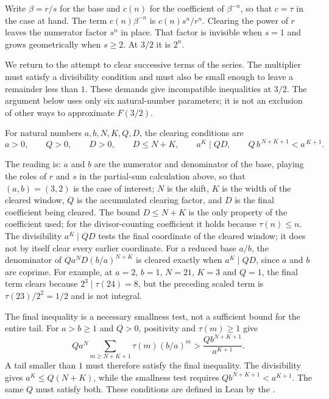 \documentclass[11pt]{article}
\begin{document}
Write $\beta=r/s$ for the base and $c(n)$ for the coefficient of $\beta^{-n}$,
so that $c=\tau$ in the case at hand.  The term $c(n)\beta^{-n}$ is
$c(n)s^{n}/r^{n}$.  Clearing the
power of $r$ leaves the numerator factor $s^{n}$ in place.  That factor is
invisible when $s=1$ and grows geometrically when $s\ge2$.  At $3/2$ it is
$2^{n}$.


We return to the attempt to clear successive terms of the series.
The multiplier must satisfy a divisibility condition and must also be
small enough to leave a remainder less than $1$. These demands give
incompatible inequalities at $3/2$. The argument below uses only six
natural-number parameters; it is not an exclusion of other ways to
approximate $F(3/2)$.

\begin{definition}\label{long1049:def:corridor}
For natural numbers $a,b,N,K,Q,D$, the clearing conditions are
\[
 a>0,\qquad Q>0,\qquad D>0,\qquad D\le N+K,\qquad
 a^{K}\mid QD,\qquad Q\,b^{\,N+K+1}<a^{\,K+1}.
\]
\end{definition}

\noindent The reading is: $a$ and $b$ are the numerator and denominator of the
base, playing the roles of $r$ and $s$ in the partial-sum calculation
above, so that
$(a,b)=(3,2)$ is the case of interest;
$N$ is the shift, $K$ is the width of the cleared window, $Q$ is the
accumulated clearing factor, and $D$ is the final coefficient being cleared.
The bound $D\le N+K$ is the only property of the coefficient used; for the
divisor-counting coefficient it holds because $\tau(n)\le n$.  The divisibility $a^{K}\mid QD$ tests the final coordinate of the cleared
window; it does not by itself clear every earlier coordinate. For a
reduced base $a/b$, the denominator of
$Qa^N D(b/a)^{N+K}$ is cleared exactly when $a^K\mid QD$, since
$a$ and $b$ are coprime. For example, at $a=2$, $b=1$,
$N=21$, $K=3$ and $Q=1$, the final term clears because
$2^3\mid\tau(24)=8$, but the preceding scaled term is
$\tau(23)/2^2=1/2$ and is not integral.

The final inequality is a necessary smallness test, not a sufficient
bound for the entire tail. For $a>b\ge1$ and $Q>0$, positivity and
$\tau(m)\ge1$ give
\[
 Q a^N\sum_{m\ge N+K+1}\tau(m)(b/a)^m
 >\frac{Qb^{N+K+1}}{a^{K+1}}.
\]
A tail smaller than $1$ must therefore satisfy the final inequality.
The divisibility gives $a^K\le Q(N+K)$, while the smallness test requires
$Qb^{N+K+1}<a^{K+1}$. The same $Q$ must satisfy both. These
conditions are defined in Lean by the
.
\end{document}

